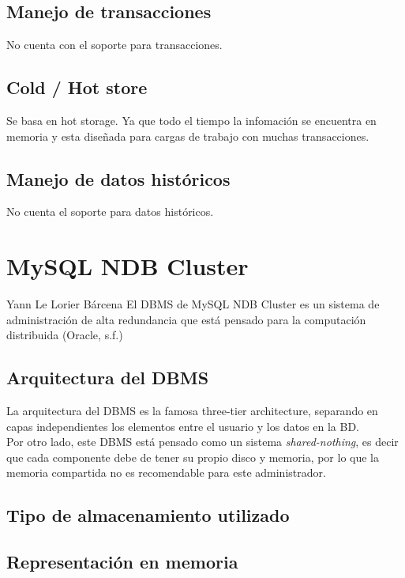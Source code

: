 \documentclass{acmart}
\begin{document}
\subsection{Manejo de transacciones}

No cuenta con el soporte para transacciones.

\subsection{Cold / Hot store}

Se basa en hot storage. Ya que todo el tiempo la infomación se encuentra en memoria y esta diseñada para cargas de trabajo con muchas transacciones.

\subsection{Manejo de datos históricos}

No cuenta el soporte para datos históricos.

\newpage

\section{MySQL NDB Cluster}
Yann Le Lorier Bárcena
El DBMS de MySQL NDB Cluster es un sistema de administración de alta redundancia que está pensado para la computación distribuida (Oracle, s.f.)
\subsection{Arquitectura del DBMS}
La arquitectura del DBMS es la famosa three-tier architecture, separando en capas independientes los elementos entre el usuario y los datos en la BD.\\
Por otro lado, este DBMS está pensado como un sistema \textit{shared-nothing}, es decir que cada componente debe de tener su propio disco y memoria, por lo que la memoria compartida no es recomendable para este administrador.
\subsection{Tipo de almacenamiento utilizado}
\subsection{Representación en memoria}
\end{document}
